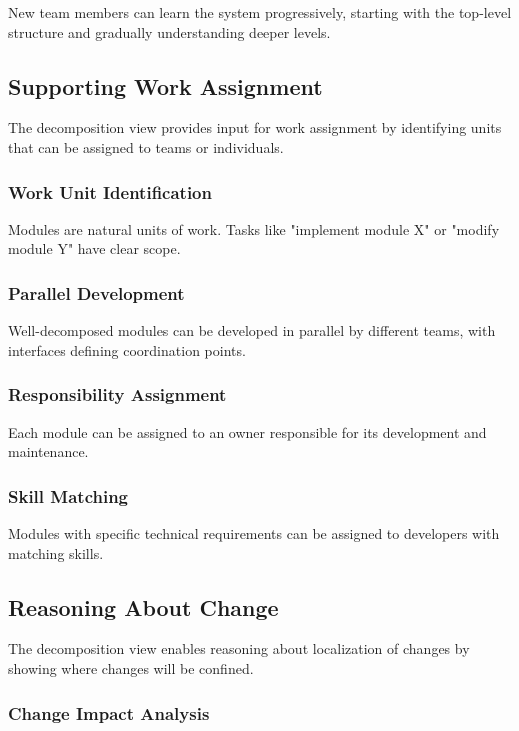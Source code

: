 \documentclass[11pt]{article}
\begin{document}
New team members can learn the system progressively, starting with the top-level structure and gradually understanding deeper levels.

\subsection{Supporting Work Assignment}

The decomposition view provides input for work assignment by identifying units that can be assigned to teams or individuals.

\subsubsection{Work Unit Identification}

Modules are natural units of work. Tasks like "implement module X" or "modify module Y" have clear scope.

\subsubsection{Parallel Development}

Well-decomposed modules can be developed in parallel by different teams, with interfaces defining coordination points.

\subsubsection{Responsibility Assignment}

Each module can be assigned to an owner responsible for its development and maintenance.

\subsubsection{Skill Matching}

Modules with specific technical requirements can be assigned to developers with matching skills.

\subsection{Reasoning About Change}

The decomposition view enables reasoning about localization of changes by showing where changes will be confined.

\subsubsection{Change Impact Analysis}
\end{document}
